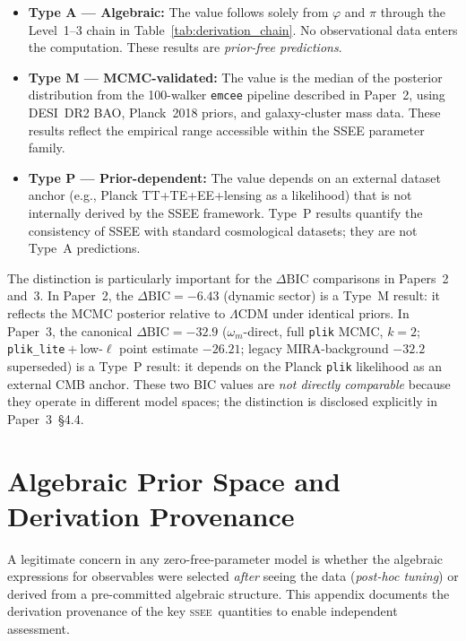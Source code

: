 \documentclass[12pt,a4paper]{article}
\newcommand{\SSEE}{\ifmmode\mathrm{SSEE}\else\textsc{ssee}\fi}
\begin{document}
\begin{itemize}
  \item \textbf{Type A — Algebraic:} The value follows solely from
  $\varphi$ and $\pi$ through the Level~1--3 chain in
  Table~\ref{tab:derivation_chain}. No observational data enters the
  computation. These results are \emph{prior-free predictions}.

  \item \textbf{Type M — MCMC-validated:} The value is the median of
  the posterior distribution from the 100-walker \texttt{emcee}
  pipeline described in Paper~2, using DESI~DR2 BAO, Planck~2018
  priors, and galaxy-cluster mass data. These results reflect the
  empirical range accessible within the SSEE parameter family.

  \item \textbf{Type P — Prior-dependent:} The value depends on an
  external dataset anchor (e.g., Planck TT+TE+EE+lensing as a
  likelihood) that is not internally derived by the SSEE framework.
  Type~P results quantify the consistency of SSEE with standard
  cosmological datasets; they are not Type~A predictions.
\end{itemize}

The distinction is particularly important for the $\Delta\mathrm{BIC}$
comparisons in Papers~2 and~3.
In Paper~2, the $\Delta\mathrm{BIC}=-6.43$ (dynamic sector) is a
Type~M result: it reflects the MCMC posterior relative to $\Lambda$CDM
under identical priors.
In Paper~3, the canonical $\Delta\mathrm{BIC}=-32.9$ ($\omega_m$-direct, full
\texttt{plik} MCMC, $k=2$; \texttt{plik\_lite}${}+{}$low-$\ell$ point estimate $-26.21$; legacy
MIRA-background $-32.2$ superseded) is a Type~P result: it depends on the Planck
\texttt{plik} likelihood as an external CMB anchor.
These two BIC values are \emph{not directly comparable} because they
operate in different model spaces; the distinction is disclosed
explicitly in Paper~3~§4.4.

\section{Algebraic Prior Space and Derivation Provenance}
\label{app:prior_space}

A legitimate concern in any zero-free-parameter model is whether the algebraic
expressions for observables were selected \emph{after} seeing the data
(\emph{post-hoc tuning}) or derived from a pre-committed algebraic structure.
This appendix documents the derivation provenance of the key \SSEE\ quantities
to enable independent assessment.
\end{document}
